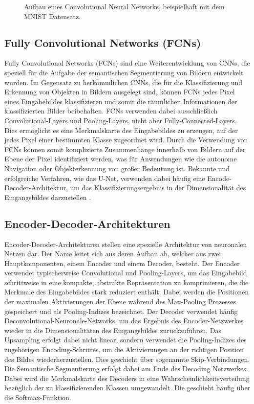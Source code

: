 \begin{figure}
    \centering
    
    \caption{Aufbau eines Convolutional Neural Networks, beispielhaft mit dem MNIST Datensatz.}
    \label{fig:CNN}
\end{figure}

\subsection{Fully Convolutional Networks (FCNs)}
Fully Convolutional Networks (FCNs) sind eine Weiterentwicklung von CNNs, die
speziell für die Aufgabe der semantischen Segmentierung von Bildern entwickelt
wurden. Im Gegensatz zu herkömmlichen CNNs, die für die Klassifizierung und
Erkennung von Objekten in Bildern ausgelegt sind, können FCNs jedes Pixel eines
Eingabebildes klassifizieren und somit die räumlichen Informationen der
klassifizierten Bilder beibehalten. FCNs verwenden dabei ausschließlich
Convolutional-Layers und Pooling-Layers, nicht aber Fully-Connected-Layers.
Dies ermöglicht es eine Merkmalskarte des Eingabebildes zu erzeugen, auf der
jedes Pixel einer bestimmten Klasse zugeordnet wird. Durch die Verwendung von
FCNs können somit komplizierte Zusammenhänge innerhalb von Bildern auf der
Ebene der Pixel identifiziert werden, was für Anwendungen wie die autonome
Navigation oder Objekterkennung von großer Bedeutung ist. \cite{7803544}
Bekannte und erfolgreiche Verfahren, wie das U-Net, verwenden dabei häufig eine
Encode-Decoder-Architektur, um das Klassifizierungsergebnis in der
Dimensionalität des Eingangsbildes darzustellen \cite{8309343}.

\subsection{Encoder-Decoder-Architekturen}
Encoder-Decoder-Architekturen stellen eine spezielle Architektur von neuronalen
Netzen dar. Der Name leitet sich aus deren Aufbau ab, welcher aus zwei
Hauptkomponenten, einem Encoder und einem Decoder, besteht. Der Encoder
verwendet typischerweise Convolutional und Pooling-Layers, um das Eingabebild
schrittweise in eine kompakte, abstrakte Repräsentation zu komprimieren, die
die Merkmale des Eingabebildes stark reduziert enthält. Dabei werden die
Positionen der maximalen Aktivierungen der Ebene während des Max-Pooling
Prozesses gespeichert und als Pooling-Indizes bezeichnet. Der Decoder verwendet
häufig Deconvolutional-Neuronale-Networks, um das Ergebnis des
Encoder-Netzwerkes wieder in die Dimensionalitäten des Eingangsbildes
zurückzuführen. Das Upsampling erfolgt dabei nicht linear, sondern verwendet
die Pooling-Indizes des zugehörigen Encoding-Schrittes, um die Aktivierungen an
der richtigen Position des Bildes wiederherzustellen. Dies geschieht über
sogenannte Skip-Verbindungen. Die Semantische Segmentierung erfolgt dabei am
Ende des Decoding Netzwerkes. Dabei wird die Merkmalskarte des Decoders in eine
Wahrscheinlichkeitsverteilung bezüglich der zu klassifizierenden Klassen
umgewandelt. Die geschieht häufig über die Softmax-Funktion. \cite{7803544}

